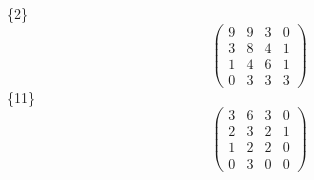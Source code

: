 \documentclass[12pt,reqno]{amsart}
\begin{document}
\Large
\{2\}                             $$ \begin{pmatrix} 
                           9 & 9 & 3 & 0 \\[6pt]
                           3 & 8 & 4 & 1 \\[6pt]
                           1 & 4 & 6 & 1 \\[6pt]
                             0 & 3 & 3 & 3
                              \end{pmatrix} $$ 
\{11\}                             $$ \begin{pmatrix} 
                           3 & 6 & 3 & 0 \\[6pt]
                           2 & 3 & 2 & 1 \\[6pt]
                           1 & 2 & 2 & 0 \\[6pt]
                             0 & 3 & 0 & 0
                              \end{pmatrix} $$ 
\end{document}
